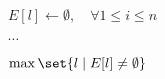 
\begin{algorithm}[H]
  \begin{algorithmic}[1]
      \State $E[l] \gets \emptyset, \quad \forall 1 \le i \le n$

      \hStatex
        \State $\cdots$
      \EndFor

      \hStatex
      \State \Return $\max \set{l \mid E[l] \neq \emptyset}$
    \EndProcedure
  \end{algorithmic}
\end{algorithm}

